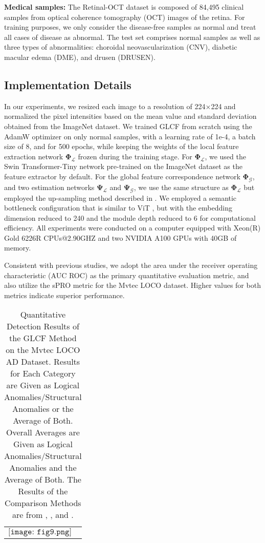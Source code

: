 \documentclass[lettersize,journal]{IEEEtran}
\begin{document}
\textbf{Medical samples:} The Retinal-OCT dataset\cite{r32} is composed of 84,495 clinical samples from optical coherence tomography (OCT) images of the retina. For training purposes, we only consider the disease-free samples as normal and treat all cases of disease as abnormal. The test set comprises normal samples as well as three types of abnormalities: choroidal neovascularization (CNV), diabetic macular edema (DME), and drusen (DRUSEN).

\subsection{Implementation Details}

In our experiments, we resized each image to a resolution of 224×224 and normalized the pixel intensities based on the mean value and standard deviation obtained from the ImageNet dataset. We trained GLCF from scratch using the AdamW optimizer on only normal samples, with a learning rate of 1e-4, a batch size of 8, and for 500 epochs, while keeping the weights of the local feature extraction network $\mathbf{\Phi_{\mathcal{L}}}$ frozen during the training stage. For $\mathbf{\Phi_{\mathcal{L}}}$, we used the Swin Transformer-Tiny network \cite{r30} pre-trained on the ImageNet dataset as the feature extractor by default. For the global feature correspondence network $\mathbf{\Phi_{\mathcal{G}}}$, and two estimation networks $\mathbf{\Psi}_{\mathcal{L}}$ and $\mathbf{\Psi}_{\mathcal{G}}$, we use the same structure as $\mathbf{\Phi_{\mathcal{L}}}$ but employed the up-sampling method described in \cite{r33}. We employed a semantic bottleneck configuration that is similar to ViT \cite{r29}, but with the embedding dimension reduced to 240 and the module depth reduced to 6 for computational efficiency. All experiments were conducted on a computer equipped with Xeon(R) Gold 6226R CPUs@2.90GHZ and two NVIDIA A100 GPUs with 40GB of memory.

Consistent with previous studies, we adopt the area under the receiver operating characteristic (AUC ROC) as the primary quantitative evaluation metric, and also utilize the sPRO\cite{r31} metric for the Mvtec LOCO dataset. Higher values for both metrics indicate superior performance.
\begin{table*}
\caption{Quantitative Detection Results of the GLCF Method on the Mvtec LOCO AD Dataset. Results for Each Category are Given as Logical Anomalies/Structural Anomalies or the Average of Both. Overall Averages are Given as Logical Anomalies/Structural Anomalies and the Average of Both. The Results of the Comparison Methods are from \cite{r31}, \cite{r39}, and \cite{r40}.}
\label{table}
\setlength{\tabcolsep}{3pt}
\begin{threeparttable}
\begin{tabular}{p{\textwidth}}
$\texttt{[image: fig9.png]}$
\end{tabular}
\end{threeparttable}
\label{table4}
\end{table*}
\end{document}
